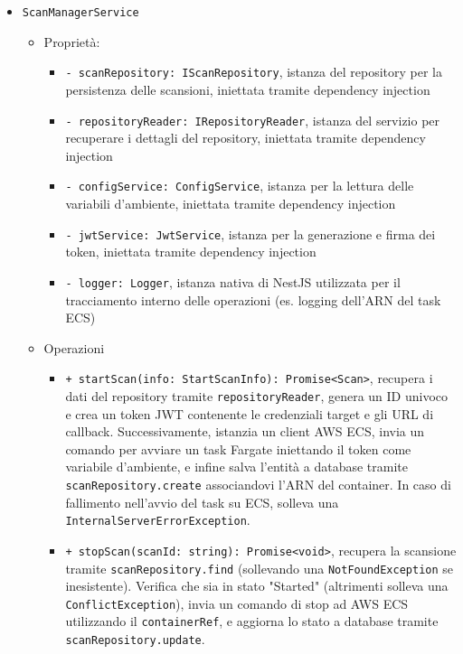 \documentclass[a4paper, 11pt]{article}
\begin{document}
\begin{itemize}
\begin{itemize}
      \item \texttt{ScanManagerService}
        \begin{itemize}
          \item Proprietà:
            \begin{itemize}
              \item \texttt{- scanRepository: IScanRepository}, istanza del repository per la persistenza delle scansioni, iniettata tramite dependency injection
              \item \texttt{- repositoryReader: IRepositoryReader}, istanza del servizio per recuperare i dettagli del repository, iniettata tramite dependency injection
              \item \texttt{- configService: ConfigService}, istanza per la lettura delle variabili d'ambiente, iniettata tramite dependency injection
              \item \texttt{- jwtService: JwtService}, istanza per la generazione e firma dei token, iniettata tramite dependency injection
              \item \texttt{- logger: Logger}, istanza nativa di NestJS utilizzata per il tracciamento interno delle operazioni (es. logging dell'ARN del task ECS)
            \end{itemize}
          \item Operazioni
            \begin{itemize}
              \item \texttt{+ startScan(info: StartScanInfo): Promise<Scan>}, recupera i dati del repository tramite \texttt{repositoryReader}, genera un ID univoco e crea un token JWT contenente le credenziali target e gli URL di callback. Successivamente, istanzia un client AWS ECS, invia un comando per avviare un task Fargate iniettando il token come variabile d'ambiente, e infine salva l'entità a database tramite \texttt{scanRepository.create} associandovi l'ARN del container. In caso di fallimento nell'avvio del task su ECS, solleva una \texttt{InternalServerErrorException}.
              \item \texttt{+ stopScan(scanId: string): Promise<void>}, recupera la scansione tramite \texttt{scanRepository.find} (sollevando una \texttt{NotFoundException} se inesistente). Verifica che sia in stato "Started" (altrimenti solleva una \texttt{ConflictException}), invia un comando di stop ad AWS ECS utilizzando il \texttt{containerRef}, e aggiorna lo stato a database tramite \texttt{scanRepository.update}.
            \end{itemize}
        \end{itemize}
    \end{itemize}
\end{itemize}
\end{document}
